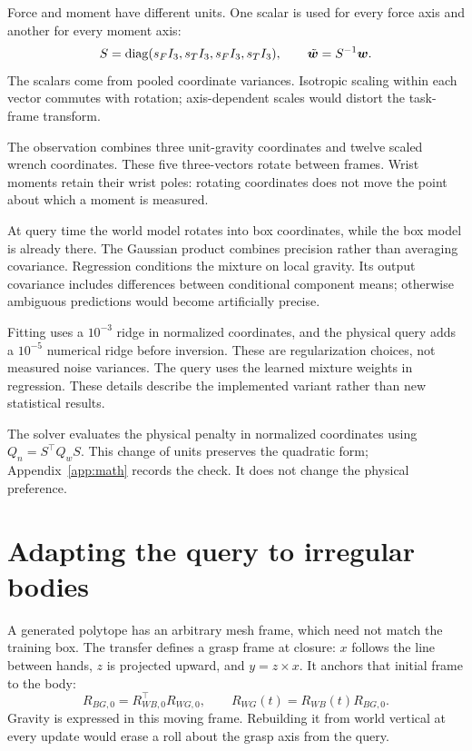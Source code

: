 Force and moment have different units. One scalar is used for every force axis and another for every moment axis:
\begin{equation}
S=\operatorname{diag}(s_F I_3,s_T I_3,s_F I_3,s_T I_3),\qquad
\tilde{\bm{w}}=S^{-1}\bm{w}.
\label{eq:scale12}
\end{equation}
The scalars come from pooled coordinate variances. Isotropic scaling within each vector commutes with rotation; axis-dependent scales would distort the task-frame transform.

The observation combines three unit-gravity coordinates and twelve scaled wrench coordinates. These five three-vectors rotate between frames. Wrist moments retain their wrist poles: rotating coordinates does not move the point about which a moment is measured.

At query time the world model rotates into box coordinates, while the box model is already there. The Gaussian product combines precision rather than averaging covariance. Regression conditions the mixture on local gravity. Its output covariance includes differences between conditional component means; otherwise ambiguous predictions would become artificially precise.

Fitting uses a $10^{-3}$ ridge in normalized coordinates, and the physical query adds a $10^{-5}$ numerical ridge before inversion. These are regularization choices, not measured noise variances. The query uses the learned mixture weights in regression. These details describe the implemented variant rather than new statistical results.

The solver evaluates the physical penalty in normalized coordinates using $Q_n=S^\top Q_wS$. This change of units preserves the quadratic form; Appendix~\ref{app:math} records the check. It does not change the physical preference.


\section{Adapting the query to irregular bodies}

A generated polytope has an arbitrary mesh frame, which need not match the training box. The transfer defines a grasp frame at closure: $x$ follows the line between hands, $z$ is projected upward, and $y=z\times x$. It anchors that initial frame to the body:
\begin{equation}
R_{BG,0}=R_{WB,0}^\top R_{WG,0},\qquad
R_{WG}(t)=R_{WB}(t)R_{BG,0}.
\label{eq:anchored-grasp}
\end{equation}
Gravity is expressed in this moving frame. Rebuilding it from world vertical at every update would erase a roll about the grasp axis from the query.

